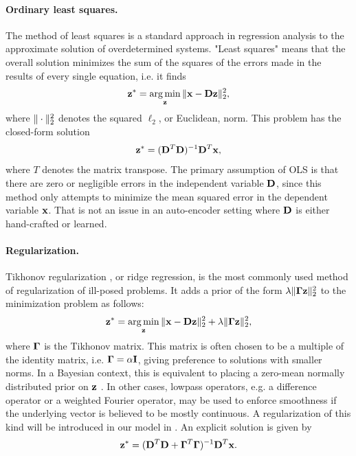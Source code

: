 \paragraph{Ordinary least squares.}
The method of least squares is a standard approach in regression analysis to the approximate solution of overdetermined systems. "Least squares" means that the overall solution minimizes the sum of the squares of the errors made in the results of every single equation, i.e. it finds
\begin{equation} \label{eqn:least_square}
	\mathbf{z}^* = \operatorname*{arg\,min}\limits_{\mathbf{z}} \| \mathbf{x} - \mathbf{D}\mathbf{z} \|_2^2,
\end{equation}
where $\| \cdot \|_2^2$ denotes the squared $\ell_2$, or Euclidean, norm. This problem has the closed-form solution
\begin{equation}
	\mathbf{z}^* = (\mathbf{D}^T\mathbf{D})^{-1} \mathbf{D}^T \mathbf{x},
\end{equation}
where $T$ denotes the matrix transpose. The primary assumption of \gls{OLS} is that there are zero or negligible errors in the independent variable $\mathbf{D}$, since this method only attempts to minimize the mean squared error in the dependent variable $\mathbf{x}$. That is not an issue in an auto-encoder setting where $\mathbf{D}$ is either hand-crafted or learned.

\paragraph{Regularization.}
Tikhonov regularization \cite{tikhonov1963tikhonovRegularization}, or ridge regression, is the most commonly used method of regularization of ill-posed problems. It adds a prior of the form $\lambda \| \mathbf{\Gamma} \mathbf{z} \|_2^2$ to the minimization problem  as follows:
\begin{equation} \label{eqn:tikhonov_regularization}
	\mathbf{z}^* = \operatorname*{arg\,min}\limits_{\mathbf{z}} \| \mathbf{x} - \mathbf{D}\mathbf{z} \|_2^2 + \lambda \| \mathbf{\Gamma} \mathbf{z} \|_2^2,
\end{equation}
where $\mathbf{\Gamma}$ is the Tikhonov matrix. This matrix is often chosen to be a multiple of the identity matrix, i.e. $\mathbf{\Gamma} = \alpha \mathbf{I}$, giving preference to solutions with smaller norms. In a Bayesian context, this is equivalent to placing a zero-mean normally distributed prior on $\mathbf{z}$ \cite{vogel2002inverseProblems}. In other cases, lowpass operators, e.g. a difference operator or a weighted Fourier operator, may be used to enforce smoothness if the underlying vector is believed to be mostly continuous. A regularization of this kind will be introduced in our model in . An explicit solution is given by
\begin{equation}
	\mathbf{z}^* = (\mathbf{D}^T\mathbf{D} + \mathbf{\Gamma}^T\mathbf{\Gamma})^{-1} \mathbf{D}^T \mathbf{x}.
\end{equation}

